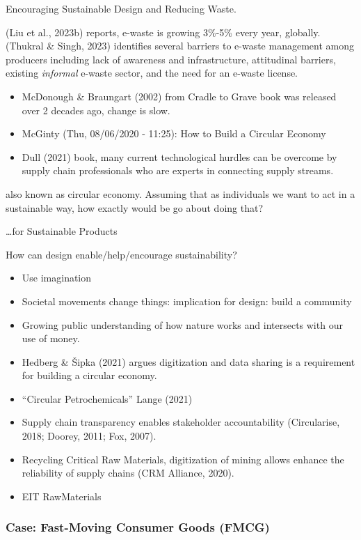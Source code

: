 \documentclass[
  letterpaper,
  DIV=11,
  numbers=noendperiod]{scrartcl}
\begin{document}
Encouraging Sustainable Design and Reducing Waste.

(Liu et al., 2023b) reports, e-waste is growing 3\%-5\% every year,
globally. (Thukral \& Singh, 2023) identifies several barriers to
e-waste management among producers including lack of awareness and
infrastructure, attitudinal barriers, existing \emph{informal} e-waste
sector, and the need for an e-waste license.

\begin{itemize}
\item
  McDonough \& Braungart (2002) from Cradle to Grave book was released
  over 2 decades ago, change is slow.
\item
  McGinty (Thu, 08/06/2020 - 11:25): How to Build a Circular Economy
\item
  Dull (2021) book, many current technological hurdles can be overcome
  by supply chain professionals who are experts in connecting supply
  streams.
\end{itemize}

also known as circular economy. Assuming that as individuals we want to
act in a sustainable way, how exactly would be go about doing that?

\ldots for Sustainable Products

How can design enable/help/encourage sustainability?

\begin{itemize}
\item
  Use imagination
\item
  Societal movements change things: implication for design: build a
  community
\item
  Growing public understanding of how nature works and intersects with
  our use of money.
\item
  Hedberg \& Šipka (2021) argues digitization and data sharing is a
  requirement for building a circular economy.
\item
  ``Circular Petrochemicals'' Lange (2021)
\item
  Supply chain transparency enables stakeholder accountability
  (Circularise, 2018; Doorey, 2011; Fox, 2007).
\item
  Recycling Critical Raw Materials, digitization of mining allows
  enhance the reliability of supply chains (CRM Alliance, 2020).
\item
  EIT RawMaterials
\end{itemize}

\subsubsection{Case: Fast-Moving Consumer Goods
(FMCG)}\label{case-fast-moving-consumer-goods-fmcg}
\end{document}
